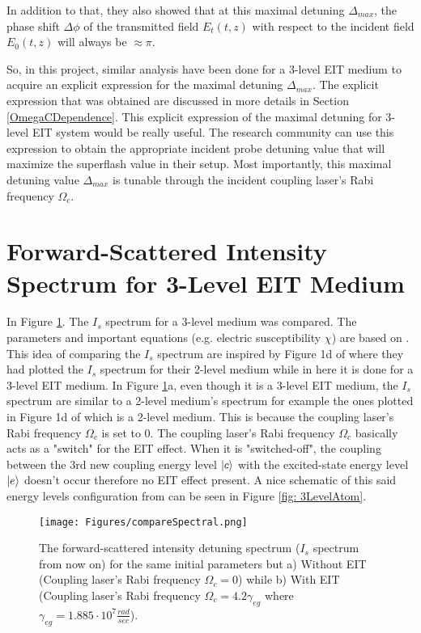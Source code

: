 In addition to that, they also showed that at this maximal detuning $\Delta_{max}$, the phase shift $\Delta\phi$ of the transmitted field $E_{t}(t, z)$ with respect to the incident field $E_{0}(t, z)$ will always be $\approx \pi$.

So, in this project, similar analysis have been done for a 3-level EIT medium to acquire an explicit expression for the maximal detuning $\Delta_{max}$. The explicit expression that was obtained are discussed in more details in Section \ref{OmegaCDependence}. This explicit expression of the maximal detuning for 3-level EIT system would be really useful. The research community can use this expression to obtain the appropriate incident probe detuning value that will maximize the superflash value in their setup. Most importantly, this maximal detuning value $\Delta_{max}$ is tunable through the incident coupling laser's Rabi frequency $\Omega_{c}$.


\section{Forward-Scattered Intensity Spectrum for 3-Level EIT Medium}
In Figure \ref{fig: comparing Is spectrum}. The $I_{s}$ spectrum for a 3-level medium was compared. The parameters and important equations (e.g. electric susceptibility $\chi$) are based on \cite{jeong2010slow}. This idea of comparing the $I_{s}$ spectrum are inspired by Figure 1d of \cite{Kwong2014} where they had plotted the $I_{s}$ spectrum for their 2-level medium while in here it is done for a 3-level EIT medium. In Figure \ref{fig: comparing Is spectrum}a, even though it is a 3-level EIT medium, the $I_{s}$ spectrum are similar to a 2-level medium's spectrum for example the ones plotted in Figure 1d of \cite{Kwong2014} which is a 2-level medium. This is because the coupling laser's Rabi frequency $\Omega_{c}$ is set to $0$. The coupling laser's Rabi frequency $\Omega_{c}$ basically acts as a "switch" for the EIT effect. When it is "switched-off", the coupling between the 3rd new coupling energy level $\ket{c}$ with the excited-state energy level $\ket{e}$ doesn't occur therefore no EIT effect present. A nice schematic of this said energy levels configuration from \cite{Jeong2009} can be seen in Figure \ref{fig: 3LevelAtom}.

\begin{figure}[h!]
    \centering
    \texttt{[image: Figures/compareSpectral.png]}
    \caption{The forward-scattered intensity detuning spectrum ($I_{s}$ spectrum from now on) for the same initial parameters but a) Without EIT (Coupling laser's Rabi frequency $\Omega_{c} = 0$) while b) With EIT (Coupling laser's Rabi frequency $\Omega_{c} = 4.2\gamma_{eg}$ where $\gamma_{eg} = 1.885 \cdot 10^{7} \frac{rad}{sec}$).}
    \label{fig: comparing Is spectrum}
\end{figure}

